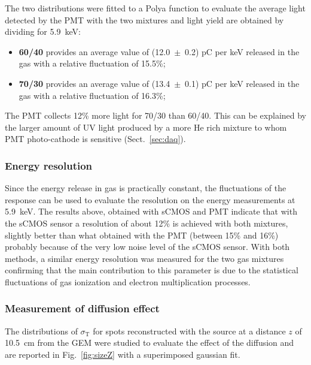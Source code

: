 \documentclass[a4paper,11pt]{article}
\begin{document}
The two distributions were fitted to a Polya function to evaluate the average light detected by the PMT with the two mixtures and 
light yield are obtained by dividing for 5.9~keV:
\begin{itemize}
    \item {\bf 60/40} provides an average value of (12.0~$\pm$~0.2) pC per keV released in the gas with a relative fluctuation of 15.5\%;
    \item {\bf 70/30} provides an average value of (13.4~$\pm$~0.1) pC per keV released in the gas with  a relative fluctuation of 16.3\%;
\end{itemize}

The PMT collects 12\% more light for 70/30 than 60/40. This can be explained by the larger amount of UV light produced by a more He rich mixture to whom PMT photo-cathode is sensitive (Sect.~\ref{sec:daq}).

\subsubsection{Energy resolution}

Since the energy release in gas is practically constant, the fluctuations of the response can be used to evaluate the resolution on the energy measurements at 5.9~keV. The results above, obtained with sCMOS and PMT indicate that with the sCMOS sensor a resolution of about 12\% is achieved with both mixtures, slightly better than what obtained with the PMT (between 15\% and 16\%) probably because of the very low noise level of the sCMOS sensor.
With both methods, a similar energy resolution was measured for the two gas mixtures confirming that the main contribution to this parameter is due to the statistical fluctuations of gas ionization and electron multiplication processes.


\subsubsection{Measurement of diffusion effect}

The distributions of $\sigma_{\mathrm{T}}$ for spots reconstructed with the source at a distance $z$ of 10.5~cm from the GEM were studied to evaluate the effect of the diffusion and are reported in Fig.~\ref{fig:sizeZ} with a superimposed gaussian fit.
\end{document}
